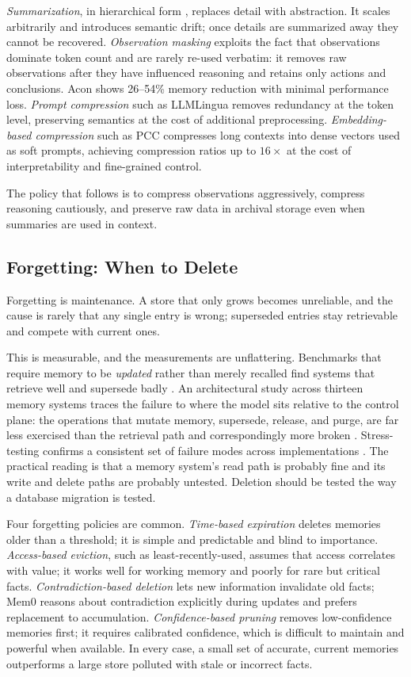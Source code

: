 \documentclass[11pt]{book}
\begin{document}
\textit{Summarization}, in hierarchical form \cite{wu2021recursively}, replaces detail with abstraction. It scales arbitrarily and introduces semantic drift; once details are summarized away they cannot be recovered. \textit{Observation masking} exploits the fact that observations dominate token count and are rarely re-used verbatim: it removes raw observations after they have influenced reasoning and retains only actions and conclusions. Acon \cite{acon2025} shows 26--54\% memory reduction with minimal performance loss. \textit{Prompt compression} such as LLMLingua \cite{jiang2023llmlingua} removes redundancy at the token level, preserving semantics at the cost of additional preprocessing. \textit{Embedding-based compression} such as PCC \cite{pcc2025} compresses long contexts into dense vectors used as soft prompts, achieving compression ratios up to $16\times$ at the cost of interpretability and fine-grained control.

The policy that follows is to compress observations aggressively, compress reasoning cautiously, and preserve raw data in archival storage even when summaries are used in context.

\subsection{Forgetting: When to Delete}

Forgetting is maintenance. A store that only grows becomes unreliable, and the cause is rarely that any single entry is wrong; superseded entries stay retrievable and compete with current ones.

This is measurable, and the measurements are unflattering. Benchmarks that require memory to be \textit{updated} rather than merely recalled find systems that retrieve well and supersede badly \cite{recallforget2026}. An architectural study across thirteen memory systems traces the failure to where the model sits relative to the control plane: the operations that mutate memory, supersede, release, and purge, are far less exercised than the retrieval path and correspondingly more broken \cite{controlplane2026}. Stress-testing confirms a consistent set of failure modes across implementations \cite{memfail2026}. The practical reading is that a memory system's read path is probably fine and its write and delete paths are probably untested. Deletion should be tested the way a database migration is tested.

Four forgetting policies are common. \textit{Time-based expiration} deletes memories older than a threshold; it is simple and predictable and blind to importance. \textit{Access-based eviction}, such as least-recently-used, assumes that access correlates with value; it works well for working memory and poorly for rare but critical facts. \textit{Contradiction-based deletion} lets new information invalidate old facts; Mem0 reasons about contradiction explicitly during updates and prefers replacement to accumulation. \textit{Confidence-based pruning} removes low-confidence memories first; it requires calibrated confidence, which is difficult to maintain and powerful when available. In every case, a small set of accurate, current memories outperforms a large store polluted with stale or incorrect facts.
\end{document}
